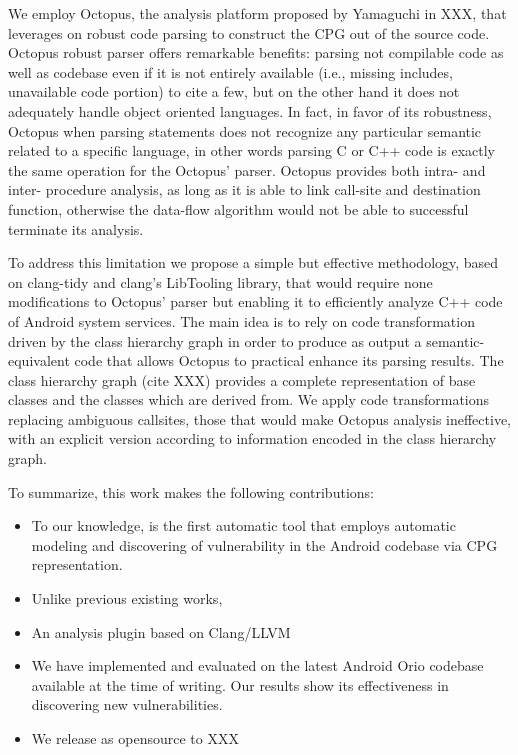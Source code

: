 We employ Octopus, the analysis platform proposed by Yamaguchi in XXX, that leverages on robust code parsing to construct the CPG out of the source code. Octopus robust parser offers remarkable benefits: parsing not compilable code as well as codebase even if it is not entirely available (i.e., missing includes, unavailable code portion) to cite a few, but on the other hand it does not adequately handle object oriented languages. In fact, in favor of its robustness, Octopus when parsing statements does not recognize any particular semantic related to a specific language, in other words parsing C  or C++ code is exactly the same operation for the Octopus' parser. Octopus provides both intra- and inter- procedure analysis, as long as it is able to link call-site and destination function, otherwise the data-flow algorithm would not be able to successful terminate its analysis.

To address this limitation we propose a simple but effective methodology, based on clang-tidy and clang's LibTooling library, that would require none modifications to Octopus' parser but enabling it to efficiently analyze C++ code of Android system services. The main idea is to rely on code transformation driven by the class hierarchy graph in order to produce as output a semantic-equivalent code that allows Octopus to practical enhance its parsing results. The class hierarchy graph (cite XXX) provides a complete representation of base classes and the classes which are derived from. We apply code transformations replacing ambiguous callsites, those that would make Octopus analysis ineffective, with an explicit version according to information encoded in the class hierarchy graph.

To summarize, this work makes the following contributions:

\begin{itemize}
\item To our knowledge, \asd is the first automatic tool that employs automatic modeling and discovering of vulnerability in the Android codebase via CPG representation. 
\item Unlike previous existing works, \asd 
\item An analysis plugin based on Clang/LLVM
\item We have implemented and evaluated \asd on the latest Android Orio codebase available at the time of writing. Our results show its effectiveness in discovering new vulnerabilities.
\item We release \asd as opensource to XXX
\end{itemize}

